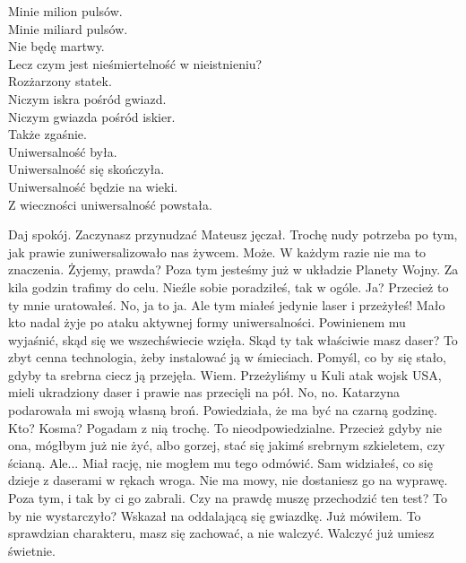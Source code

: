 \noindent
Minie milion pulsów. \\
Minie miliard pulsów. \\
Nie będę martwy. \\
Lecz czym jest nieśmiertelność w nieistnieniu? \\

\noindent
Rozżarzony statek. \\
Niczym iskra pośród gwiazd. \\
Niczym gwiazda pośród iskier. \\
Także zgaśnie. \\

\noindent
Uniwersalność była. \\
Uniwersalność się skończyła. \\
Uniwersalność będzie na wieki. \\
Z wieczności uniwersalność powstała. \\

\begin{dialogue}
\ds{} Daj spokój. Zaczynasz przynudzać \dm{} Mateusz jęczał. 
\ds{} Trochę nudy potrzeba po tym, jak prawie zuniwersalizowało nas żywcem.
\ds{} Może. W każdym razie nie ma to znaczenia. Żyjemy, prawda? Poza tym jesteśmy już w układzie Planety Wojny. Za kila godzin trafimy do celu.
\ds{} Nieźle sobie poradziłeś, tak w ogóle.
\ds{} Ja? Przecież to ty mnie uratowałeś. 
\ds{} No, ja to ja. Ale tym miałeś jedynie laser i przeżyłeś! Mało kto nadal żyje po ataku aktywnej formy uniwersalności. \dm{} Powinienem mu wyjaśnić, skąd się we wszechświecie wzięła. \dm{}
Skąd ty tak właściwie masz daser? To zbyt cenna technologia, żeby instalować ją w śmieciach. Pomyśl, co by się stało, gdyby ta srebrna ciecz ją przejęła.
\ds{} Wiem. Przeżyliśmy u Kuli atak wojsk USA, mieli ukradziony daser i prawie nas przecięli na pół.
\ds{} No, no.
\ds{} Katarzyna podarowała mi swoją własną broń. Powiedziała, że ma być na czarną godzinę.
\ds{} Kto? Kosma? Pogadam z nią trochę. To nieodpowiedzialne.
\ds{} Przecież gdyby nie ona, mógłbym już nie żyć, albo gorzej, stać się jakimś srebrnym szkieletem, czy ścianą.
\ds{} Ale... \dm{} Miał rację, nie mogłem mu tego odmówić. \dm{} Sam widziałeś, co się dzieje z daserami w rękach wroga. Nie ma mowy, nie dostaniesz go na wyprawę.
Poza tym, i tak by ci go zabrali.
\ds{} Czy na prawdę muszę przechodzić ten test? To by nie wystarczyło? \dm{} Wskazał na oddalającą się gwiazdkę.
\ds{} Już mówiłem. To sprawdzian charakteru, masz się zachować, a nie walczyć. Walczyć już umiesz świetnie.
\end{dialogue}

